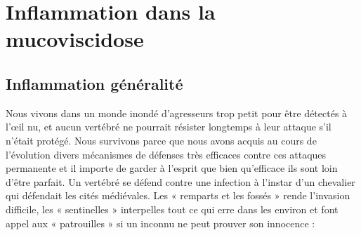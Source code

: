 
\chapter{Inflammation dans la mucoviscidose} %


\label{ch:02-04} %



\section{Inflammation généralité}
Nous vivons dans un monde inondé d’agresseurs trop petit pour être détectés à l’œil nu, et aucun vertébré ne pourrait résister longtemps à leur attaque s’il n’était protégé. Nous survivons parce que nous avons acquis au cours de l’évolution divers mécanismes de défenses très efficaces contre ces attaques permanente et il importe de garder à l’esprit que bien qu’efficace ils sont loin d’être parfait. 
Un vertébré se défend contre une infection à l’instar d’un chevalier qui défendait les cités médiévales. Les « remparts et les fossés » rende l’invasion difficile, les « sentinelles » interpelles tout ce qui erre dans les environ et font appel aux « patrouilles » si un inconnu ne peut prouver son innocence :
